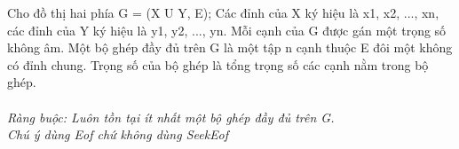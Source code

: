 Cho đồ thị hai phía G = (X U Y, E); Các đỉnh của X ký hiệu là x1, x2, ..., xn, các đỉnh của Y ký hiệu là y1, y2, ..., yn. Mỗi cạnh của G được gán một trọng số không âm. Một bộ ghép đầy đủ trên G là một tập n cạnh thuộc E đôi một không có đỉnh chung. Trọng số của  bộ ghép là tổng trọng số các cạnh nằm trong bộ ghép.   
\\
\\\textit{    Ràng buộc: Luôn tồn tại ít nhất một bộ ghép đầy đủ trên G.   }
\\\textit{    Chú ý dùng         Eof        chứ không dùng         SeekEof       }

\
